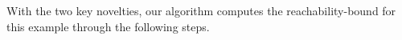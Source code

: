 With the two key novelties, our algorithm computes the reachability-bound for this example through the following steps.





% 

